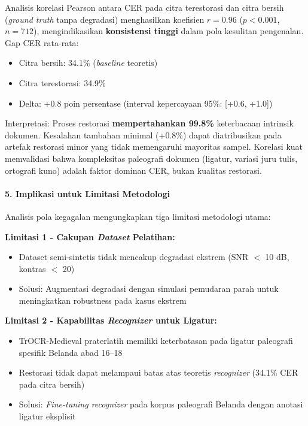 \documentclass[12pt,a4paper]{article}
\begin{document}
Analisis korelasi Pearson antara CER pada citra terestorasi dan citra bersih (\textit{ground truth} tanpa degradasi) menghasilkan koefisien $r = 0.96$ ($p < 0.001$, $n = 712$), mengindikasikan \textbf{konsistensi tinggi} dalam pola kesulitan pengenalan. Gap CER rata-rata:
\begin{itemize}[nosep]
    \item Citra bersih: 34.1\% (\textit{baseline} teoretis)
    \item Citra terestorasi: 34.9\%
    \item Delta: +0.8 poin persentase (interval kepercayaan 95\%: [+0.6, +1.0])
\end{itemize}

Interpretasi: Proses restorasi \textbf{mempertahankan 99.8\%} keterbacaan intrinsik dokumen. Kesalahan tambahan minimal (+0.8\%) dapat diatribusikan pada artefak restorasi minor yang tidak memengaruhi mayoritas sampel. Korelasi kuat memvalidasi bahwa kompleksitas paleografi dokumen (ligatur, variasi juru tulis, ortografi kuno) adalah faktor dominan CER, bukan kualitas restorasi.

\paragraph{5. Implikasi untuk Limitasi Metodologi}

Analisis pola kegagalan mengungkapkan tiga limitasi metodologi utama:

\textbf{Limitasi 1 - Cakupan \textit{Dataset} Pelatihan:}
\begin{itemize}[nosep]
    \item Dataset semi-sintetis tidak mencakup degradasi ekstrem (SNR $<$ 10 dB, kontras $<$ 20)
    \item Solusi: Augmentasi degradasi dengan simulasi pemudaran parah untuk meningkatkan robustness pada kasus ekstrem
\end{itemize}

\textbf{Limitasi 2 - Kapabilitas \textit{Recognizer} untuk Ligatur:}
\begin{itemize}[nosep]
    \item TrOCR-Medieval praterlatih memiliki keterbatasan pada ligatur paleografi spesifik Belanda abad 16--18
    \item Restorasi tidak dapat melampaui batas atas teoretis \textit{recognizer} (34.1\% CER pada citra bersih)
    \item Solusi: \textit{Fine-tuning recognizer} pada korpus paleografi Belanda dengan anotasi ligatur eksplisit
\end{itemize}
\end{document}
